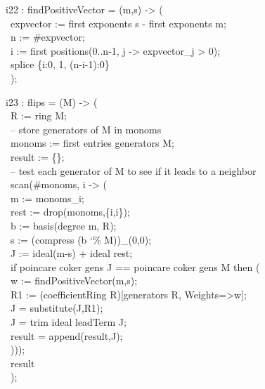 \beginOutput
i22 : findPositiveVector = (m,s) -> (\\
\           expvector := first exponents s - first exponents m;\\
\           n := #expvector;\\
\           i := first positions(0..n-1, j -> expvector_j > 0);\\
\           splice \{i:0, 1, (n-i-1):0\}\\
\           );\\
\endOutput

\beginOutput
i23 : flips = (M) -> (\\
\           R := ring M;\\
\           -- store generators of M in monoms\\
\           monoms := first entries generators M;\\
\           result := \{\};\\
\           -- test each generator of M to see if it leads to a neighbor \\
\           scan(#monoms, i -> (\\
\             m := monoms_i;\\
\             rest := drop(monoms,\{i,i\});\\
\             b := basis(degree m, R);\\
\             s := (compress (b {\char`\%} M))_(0,0);\\
\             J := ideal(m-s) + ideal rest;\\
\             if poincare coker gens J == poincare coker gens M then (\\
\               w := findPositiveVector(m,s);\\
\               R1 := (coefficientRing R)[generators R, Weights=>w];\\
\               J = substitute(J,R1);\\
\               J = trim ideal leadTerm J;\\
\               result = append(result,J);\\
\               )));\\
\           result\\
\      );\\
\endOutput

